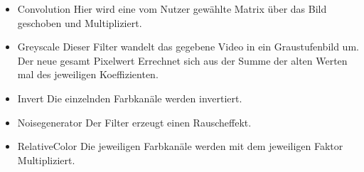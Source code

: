 \begin{itemize}
\item Convolution \newline
Hier wird eine vom Nutzer gewählte Matrix über das Bild geschoben und Multipliziert.
\item Greyscale \newline
Dieser Filter wandelt das gegebene Video in ein Graustufenbild um. 
Der neue gesamt Pixelwert Errechnet sich aus  der Summe der alten Werten mal des jeweiligen Koeffizienten.
\item Invert \newline
Die einzelnden Farbkanäle werden invertiert.
\item Noisegenerator \newline
Der Filter erzeugt einen Rauscheffekt.
\item RelativeColor \newline
Die jeweiligen Farbkanäle werden mit dem jeweiligen Faktor Multipliziert.

\end{itemize}


